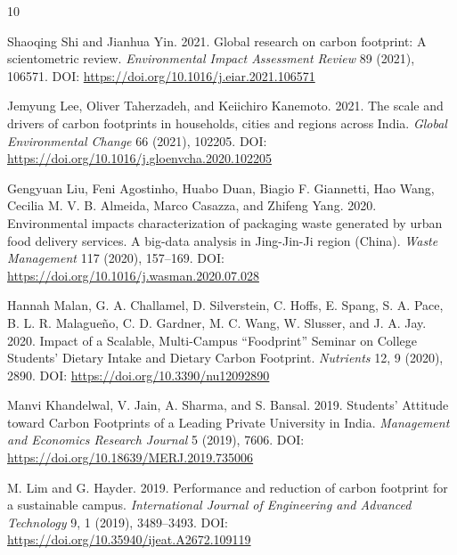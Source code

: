 \documentclass[12pt, a4paper]{article}
\begin{document}
\begin{thebibliography}{10}

Shaoqing Shi and Jianhua Yin. 2021. Global research on carbon footprint: A scientometric review. \emph{Environmental Impact Assessment Review} 89 (2021), 106571. DOI: \href{https://doi.org/10.1016/j.eiar.2021.106571}{https://doi.org/10.1016/j.eiar.2021.106571}

Jemyung Lee, Oliver Taherzadeh, and Keiichiro Kanemoto. 2021. The scale and drivers of carbon footprints in households, cities and regions across India. \emph{Global Environmental Change} 66 (2021), 102205. DOI: \href{https://doi.org/10.1016/j.gloenvcha.2020.102205}{https://doi.org/10.1016/j.gloenvcha.2020.102205}

Gengyuan Liu, Feni Agostinho, Huabo Duan, Biagio F. Giannetti, Hao Wang, Cecilia M. V. B. Almeida, Marco Casazza, and Zhifeng Yang. 2020. Environmental impacts characterization of packaging waste generated by urban food delivery services. A big-data analysis in Jing-Jin-Ji region (China). \emph{Waste Management} 117 (2020), 157--169. DOI: \href{https://doi.org/10.1016/j.wasman.2020.07.028}{https://doi.org/10.1016/j.wasman.2020.07.028}

Hannah Malan, G. A. Challamel, D. Silverstein, C. Hoffs, E. Spang, S. A. Pace, B. L. R. Malague\~{n}o, C. D. Gardner, M. C. Wang, W. Slusser, and J. A. Jay. 2020. Impact of a Scalable, Multi-Campus ``Foodprint'' Seminar on College Students' Dietary Intake and Dietary Carbon Footprint. \emph{Nutrients} 12, 9 (2020), 2890. DOI: \href{https://doi.org/10.3390/nu12092890}{https://doi.org/10.3390/nu12092890}

Manvi Khandelwal, V. Jain, A. Sharma, and S. Bansal. 2019. Students' Attitude toward Carbon Footprints of a Leading Private University in India. \emph{Management and Economics Research Journal} 5 (2019), 7606. DOI: \href{https://doi.org/10.18639/MERJ.2019.735006}{https://doi.org/10.18639/MERJ.2019.735006}

M. Lim and G. Hayder. 2019. Performance and reduction of carbon footprint for a sustainable campus. \emph{International Journal of Engineering and Advanced Technology} 9, 1 (2019), 3489--3493. DOI: \href{https://doi.org/10.35940/ijeat.A2672.109119}{https://doi.org/10.35940/ijeat.A2672.109119}


\end{thebibliography}
\end{document}
